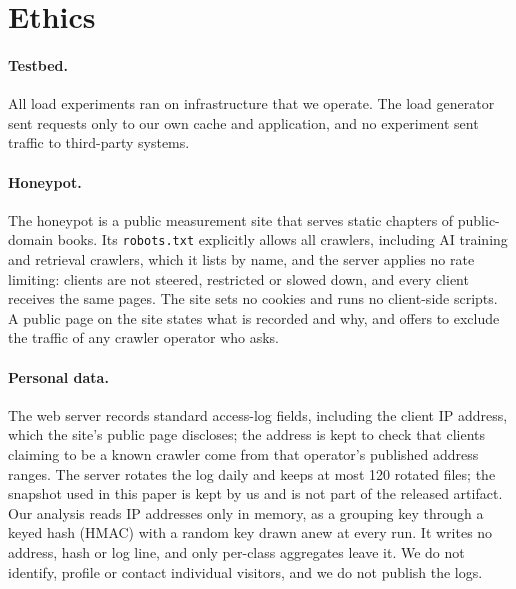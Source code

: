 \section{Ethics}\label{app:ethics}

\paragraph{Testbed.}
All load experiments ran on infrastructure that we operate.
The load generator sent requests only to our own cache and application, and no
experiment sent traffic to third-party systems.

\paragraph{Honeypot.}
The honeypot is a public measurement site that serves static chapters of public-domain
books.
Its \texttt{robots.txt} explicitly allows all crawlers, including AI training and
retrieval crawlers, which it lists by name, and the server applies no rate limiting: clients
are not steered, restricted or slowed down, and every client receives the same pages.
The site sets no cookies and runs no client-side scripts.
A public page on the site states what is recorded and why, and offers to exclude the
traffic of any crawler operator who asks.

\paragraph{Personal data.}
The web server records standard access-log fields, including the client IP address, which
the site's public page discloses; the address is kept to check that clients claiming to be
a known crawler come from that operator's published address ranges.
The server rotates the log daily and keeps at most 120 rotated files; the snapshot used in
this paper is kept by us and is not part of the released artifact.
Our analysis reads IP addresses only in memory, as a grouping key through a keyed hash
(HMAC) with a random key drawn anew at every run.
It writes no address, hash or log line, and only per-class aggregates leave it.
We do not identify, profile or contact individual visitors, and we do not publish the logs.

